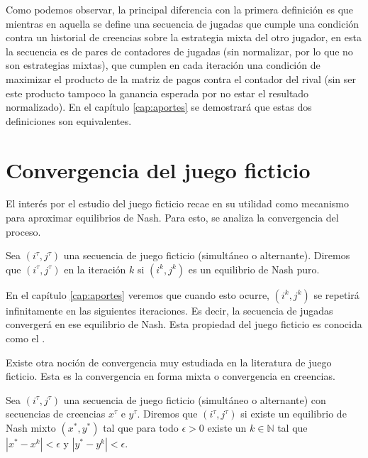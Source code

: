 Como podemos observar, la principal diferencia con la primera definición es que mientras en aquella se define una secuencia de jugadas que cumple una condición contra un historial de creencias sobre la estrategia mixta del otro jugador, en esta la secuencia es de pares de contadores de jugadas (sin normalizar, por lo que no son estrategias mixtas), que cumplen en cada iteración una condición de maximizar el producto de la matriz de pagos contra el contador del rival (sin ser este producto tampoco la ganancia esperada por no estar el resultado normalizado). En el capítulo \ref{cap:aportes} se demostrará que estas dos definiciones son equivalentes.

\section{Convergencia del juego ficticio}

El interés por el estudio del juego ficticio recae en su utilidad como mecanismo para aproximar equilibrios de Nash. Para esto, se analiza la convergencia del proceso.

\begin{definition}

    Sea $(i^\tau, j^\tau)$ una secuencia de juego ficticio (simultáneo o alternante). Diremos que $(i^\tau, j^\tau)$  en la iteración $k$ si $(i^k, j^k)$ es un equilibrio de Nash puro.

\end{definition}

En el capítulo \ref{cap:aportes} veremos que cuando esto ocurre, $(i^k, j^k)$ se repetirá infinitamente en las siguientes iteraciones. Es decir, la secuencia de jugadas convergerá en ese equilibrio de Nash. Esta propiedad del juego ficticio es conocida como el .


Existe otra noción de convergencia muy estudiada en la literatura de juego ficticio. Esta es la convergencia en forma mixta o convergencia en creencias.

\begin{definition}
    Sea $(i^\tau, j^\tau)$ una secuencia de juego ficticio (simultáneo o alternante) con secuencias de creencias $x^\tau$ e $y^\tau$. Diremos que $(i^\tau, j^\tau)$  si existe un equilibrio de Nash mixto $(x^*, y^*)$ tal que para todo $\epsilon > 0$ existe un $k \in \mathbb{N}$ tal que $|x^* - x^k| < \epsilon$ y $|y^* - y^k| < \epsilon$.
\end{definition}

